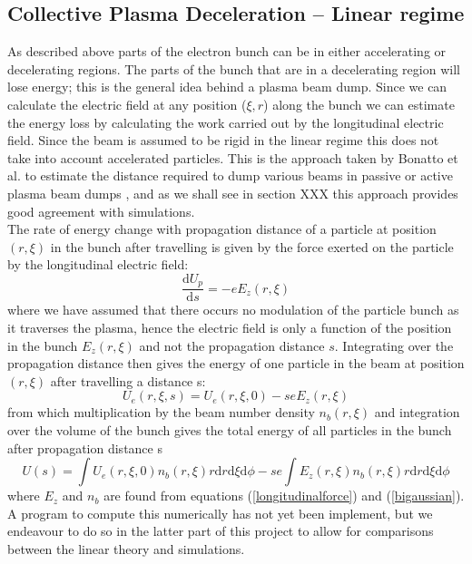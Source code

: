 \subsection{Collective Plasma Deceleration -- Linear regime }
As described above parts of the electron bunch can be in either accelerating or decelerating regions. The parts of the bunch that are in a decelerating region will lose energy; this is the general idea behind a plasma beam dump. Since we can calculate the electric field at any position ($\xi,r$) along the bunch we can estimate the energy loss by calculating the work carried out by the longitudinal electric field. Since the beam is assumed to be rigid in the linear regime this does not take into account accelerated particles. This is the approach taken by Bonatto et al. to estimate the distance required to dump various beams in passive or active plasma beam dumps \citep{Bonatto2016}, and as we shall see in section XXX this approach provides good agreement with simulations.\\
The rate of energy change with propagation distance of a particle at position $(r,\xi)$ in the bunch after travelling is given by the force exerted on the particle by the longitudinal electric field:
\begin{equation}
\frac{\mathrm{d}U_p}{\mathrm{d}s}=-eE_z(r,\xi)
\end{equation}
where we have assumed that there occurs no modulation of the particle bunch as it traverses the plasma, hence the electric field is only a function of the position in the bunch $E_z(r,\xi)$ and not the propagation distance $s$. Integrating over the propagation distance then gives the energy of one particle in the beam at position $(r,\xi)$ after travelling a distance s:
\begin{equation}
U_e(r,\xi,s)=U_e(r,\xi,0)-seE_z(r,\xi)
\end{equation}
from which multiplication by the beam number density $n_b(r,\xi)$ and integration over the volume of the bunch gives the total energy of all particles in the bunch after propagation distance s
\begin{equation}
U(s)=\int  U_e(r,\xi,0)n_b(r,\xi)r\mathrm{d}r\mathrm{d}\xi\mathrm{d}\phi-se\int E_z(r,\xi)n_b(r,\xi)r\mathrm{d}r\mathrm{d}\xi\mathrm{d}\phi
\label{energy_loss_bonatto}
\end{equation}
where $E_z$ and $n_b$ are found from equations (\ref{longitudinalforce}) and (\ref{bigaussian}). A program to compute this numerically has not yet been implement, but we endeavour to do so in the latter part of this project to allow for comparisons between the linear theory and simulations.
